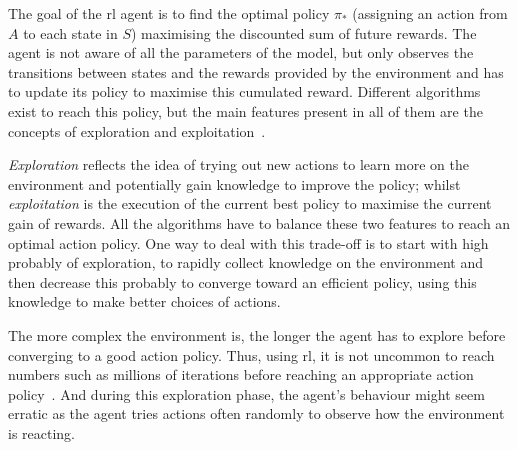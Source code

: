 	The goal of the \gls{rl} agent is to find the optimal policy $\pi_*$ (assigning an action from $A$ to each state in $S$) maximising the discounted sum of future rewards. The agent is not aware of all the parameters of the model, but only observes the transitions between states and the rewards provided by the environment and has to update its policy to maximise this cumulated reward. Different algorithms exist to reach this policy, but the main features present in all of them are the concepts of exploration and exploitation~\citep{sutton1998reinforcement}.
	
	\emph{Exploration} reflects the idea of trying out new actions to learn more on the environment and potentially gain knowledge to improve the policy; whilst \emph{exploitation} is the execution of the current best policy to maximise the current gain of rewards. All the algorithms have to balance these two features to reach an optimal action policy. One way to deal with this trade-off is to start with high probably of exploration, to rapidly collect knowledge on the environment and then decrease this probably to converge toward an efficient policy, using this knowledge to make better choices of actions.
	
	The more complex the environment is, the longer the agent has to explore before converging to a good action policy. Thus, using \gls{rl}, it is not uncommon to reach numbers such as millions of iterations before reaching an appropriate action policy~\citep{sutton1998reinforcement}. And during this exploration phase, the agent's behaviour might seem erratic as the agent tries actions often randomly to observe how the environment is reacting.
	
	
